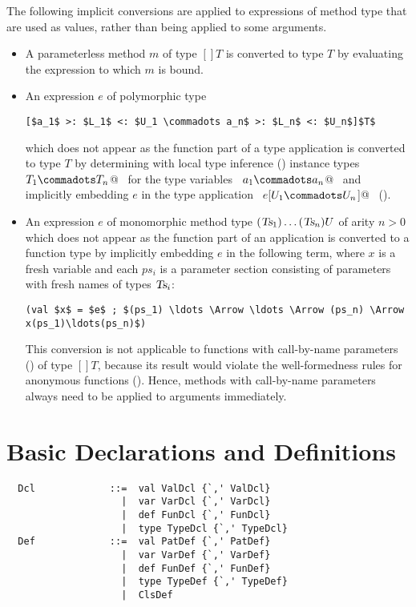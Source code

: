 \documentclass[a4paper,12pt,twoside,titlepage]{book}
\newcommand{\Ts}{\mbox{\sl Ts}}
\begin{document}
The following implicit conversions are applied to expressions of
method type that are used as values, rather than being applied to some
arguments.
\begin{itemize}
\item
A parameterless method $m$ of type $[] T$
is converted to type $T$ by evaluating the expression to which $m$ is bound.
\item
An expression $e$ of polymorphic type 
\begin{lstlisting}
[$a_1$ >: $L_1$ <: $U_1 \commadots a_n$ >: $L_n$ <: $U_n$]$T$
\end{lstlisting}
which does not appear as the function part of
a type application is converted to type $T$
by determining with local type inference
() instance types ~\lstinline@$T_1 \commadots T_n$@~ 
for the type variables ~\lstinline@$a_1 \commadots a_n$@~ and
implicitly embedding $e$ in the type application
~\lstinline@$e$[$U_1 \commadots U_n$]@~ ().
\item
An expression $e$ of monomorphic method type
$(\Ts_1) \ldots (\Ts_n) U$ of arity $n > 0$
which does not appear as the function part of an application is
converted to a function type by implicitly embedding $e$ in
the following term, where $x$ is a fresh variable and each $ps_i$ is a
parameter section consisting of parameters with fresh names of types $\Ts_i$:
\begin{lstlisting}
(val $x$ = $e$ ; $(ps_1) \ldots \Arrow \ldots \Arrow (ps_n) \Arrow x(ps_1)\ldots(ps_n)$)
\end{lstlisting}
This conversion is not applicable to functions with call-by-name
parameters () of type $[]T$, because its result
would violate the well-formedness rules for anonymous functions
(). Hence, methods with call-by-name
parameters always need to be applied to arguments immediately.
\end{itemize}

\chapter{Basic Declarations and Definitions}
\label{sec:defs}

\syntax\begin{lstlisting}
  Dcl             ::=  val ValDcl {`,' ValDcl}
                    |  var VarDcl {`,' VarDcl}
                    |  def FunDcl {`,' FunDcl}
                    |  type TypeDcl {`,' TypeDcl}
  Def             ::=  val PatDef {`,' PatDef}
                    |  var VarDef {`,' VarDef}
                    |  def FunDef {`,' FunDef}
                    |  type TypeDef {`,' TypeDef}
                    |  ClsDef
\end{lstlisting}
\end{document}
